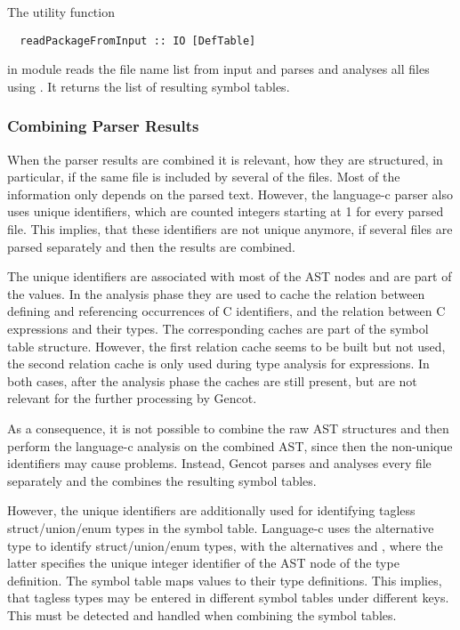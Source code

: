 The utility function
\begin{verbatim}
  readPackageFromInput :: IO [DefTable]
\end{verbatim}
in module  reads the file name list from input and parses and analyses all files using 
. It returns the list of resulting symbol tables.

\subsubsection{Combining Parser Results}

When the parser results are combined it is relevant, how they are structured, in particular, if the same file
is included by several of the  files. Most of the information only depends on the parsed text.
However, the language-c parser also uses unique identifiers, which are counted integers starting at 1 for every
parsed file. This implies, that these identifiers are not unique anymore, if several files are parsed separately
and then the results are combined.

The unique identifiers are associated with most of the AST nodes and are part of the  values.
In the analysis phase they are used to cache the relation between defining and referencing occurrences of C identifiers,
and the relation between C expressions and their types. The corresponding caches are part of the symbol table structure.
However, the first relation cache seems to be built but not used, the second relation cache is only used during 
type analysis for expressions. In both cases, after the analysis phase the caches are still present, but are not 
relevant for the further processing by Gencot.

As a consequence, it is not possible to combine the raw AST structures and then perform the language-c analysis
on the combined AST, since then the non-unique identifiers may cause problems. Instead, Gencot parses and analyses
every file separately and the combines the resulting symbol tables.

However, the unique identifiers are additionally used for identifying tagless struct/union/enum types in the symbol table.
Language-c uses the alternative type  to identify struct/union/enum types, with the alternatives 
 and , where the latter specifies the unique integer identifier of the AST node
of the type definition. The symbol table maps  values to their type definitions. This implies, that
tagless types may be entered in different symbol tables under different keys. This must be detected and handled
when combining the symbol tables.

